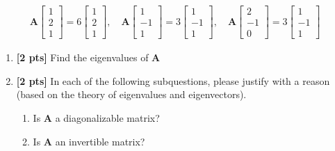 \documentclass[11pt,addpoints,answers]{exam}
\numberwithin{equation}{section} %
\numberwithin{figure}{section} %
\numberwithin{table}{section} %
\begin{document}
\begin{questions}
    \begin{align*}
    \mathbf{A} \begin{bmatrix}
        1 \\2 \\1
    \end{bmatrix} = 6\begin{bmatrix}
        1 \\ 2 \\1
    \end{bmatrix}, \quad \mathbf{A}\begin{bmatrix}
        1 \\ -1 \\ 1
    \end{bmatrix} = 3 \begin{bmatrix}
        1 \\ -1 \\ 1
    \end{bmatrix}, \quad \mathbf{A} \begin{bmatrix}
        2 \\ -1 \\ 0
    \end{bmatrix} = 3 \begin{bmatrix}
        1 \\ -1 \\ 1
    \end{bmatrix}
    \end{align*}
    \begin{enumerate}[label=\Roman*]
        \item \textbf{[2 pts]} Find the eigenvalues of $\mathbf{A}$
        \item \textbf{[2 pts]} In each of the following subquestions, please justify with a reason (based on the theory of eigenvalues and eigenvectors).
        \begin{enumerate}
            \item Is $\mathbf{A}$ a diagonalizable matrix?
            \item Is $\mathbf{A}$ an invertible matrix?
        \end{enumerate}

    \end{enumerate}
    \begin{tcolorbox}[fit,height=14cm, width=\textwidth, blank, borderline={0.5pt}{-2pt},halign=center, valign=center, nobeforeafter]
    

\end{tcolorbox}
\end{questions}
\end{document}
